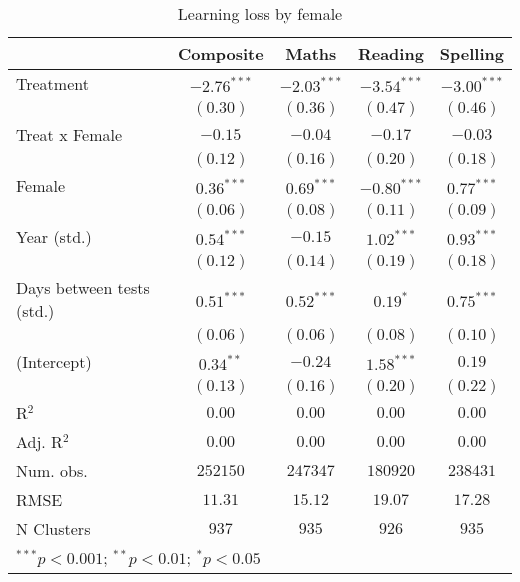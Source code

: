 
\begin{table}
\begin{center}
\begin{tabular}{l c c c c}
\hline
 & Composite & Maths & Reading & Spelling \\
\hline
Treatment                 & $-2.76^{***}$ & $-2.03^{***}$ & $-3.54^{***}$ & $-3.00^{***}$ \\
                          & $(0.30)$      & $(0.36)$      & $(0.47)$      & $(0.46)$      \\
Treat x Female            & $-0.15$       & $-0.04$       & $-0.17$       & $-0.03$       \\
                          & $(0.12)$      & $(0.16)$      & $(0.20)$      & $(0.18)$      \\
Female                    & $0.36^{***}$  & $0.69^{***}$  & $-0.80^{***}$ & $0.77^{***}$  \\
                          & $(0.06)$      & $(0.08)$      & $(0.11)$      & $(0.09)$      \\
Year (std.)               & $0.54^{***}$  & $-0.15$       & $1.02^{***}$  & $0.93^{***}$  \\
                          & $(0.12)$      & $(0.14)$      & $(0.19)$      & $(0.18)$      \\
Days between tests (std.) & $0.51^{***}$  & $0.52^{***}$  & $0.19^{*}$    & $0.75^{***}$  \\
                          & $(0.06)$      & $(0.06)$      & $(0.08)$      & $(0.10)$      \\
(Intercept)               & $0.34^{**}$   & $-0.24$       & $1.58^{***}$  & $0.19$        \\
                          & $(0.13)$      & $(0.16)$      & $(0.20)$      & $(0.22)$      \\
\hline
R$^2$                     & $0.00$        & $0.00$        & $0.00$        & $0.00$        \\
Adj. R$^2$                & $0.00$        & $0.00$        & $0.00$        & $0.00$        \\
Num. obs.                 & $252150$      & $247347$      & $180920$      & $238431$      \\
RMSE                      & $11.31$       & $15.12$       & $19.07$       & $17.28$       \\
N Clusters                & $937$         & $935$         & $926$         & $935$         \\
\hline
\multicolumn{5}{l}{\scriptsize{$^{***}p<0.001$; $^{**}p<0.01$; $^{*}p<0.05$}}
\end{tabular}
\caption{Learning loss by female}
\label{tablefemale}
\end{center}
\end{table}
